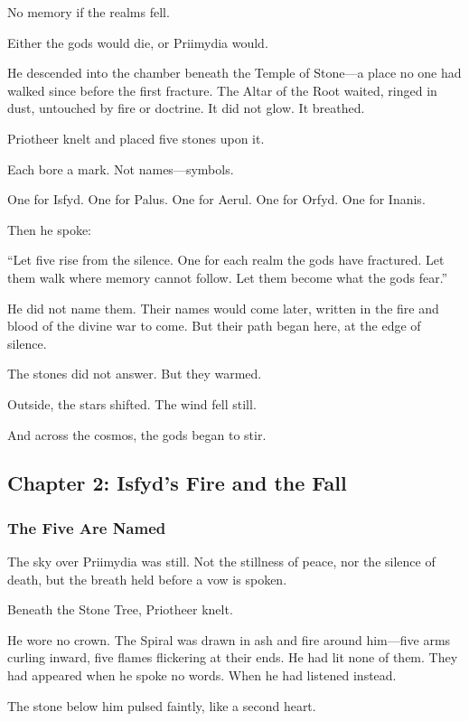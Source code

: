 \documentclass[12pt]{article}
\begin{document}
No memory if the realms fell. 

Either the gods would die, or Priimydia would.

He descended into the chamber beneath the Temple of Stone—a place no one had walked since before the first fracture. The Altar of the Root waited, ringed in dust, untouched by fire or doctrine. It did not glow. It breathed.

Priotheer knelt and placed five stones upon it.

Each bore a mark. Not names—symbols.

One for Isfyd. One for Palus. One for Aerul. One for Orfyd. One for Inanis.

Then he spoke:

“Let five rise from the silence. One for each realm the gods have fractured.  
Let them walk where memory cannot follow.  
Let them become what the gods fear.”

He did not name them. Their names would come later, written in the fire and blood of the divine war to come. But their path began here, at the edge of silence.

The stones did not answer. But they warmed.

Outside, the stars shifted. The wind fell still.

And across the cosmos, the gods began to stir.

\newpage

\subsection*{Chapter 2: Isfyd's Fire and the Fall}

\vspace{.5in}

\subsubsection*{The Five Are Named}

The sky over Priimydia was still. Not the stillness of peace, nor the silence of death, but the breath held before a vow is spoken.

Beneath the Stone Tree, Priotheer knelt.

He wore no crown. The Spiral was drawn in ash and fire around him—five arms curling inward, five flames flickering at their ends. He had lit none of them. They had appeared when he spoke no words. When he had listened instead.

The stone below him pulsed faintly, like a second heart.
\end{document}
